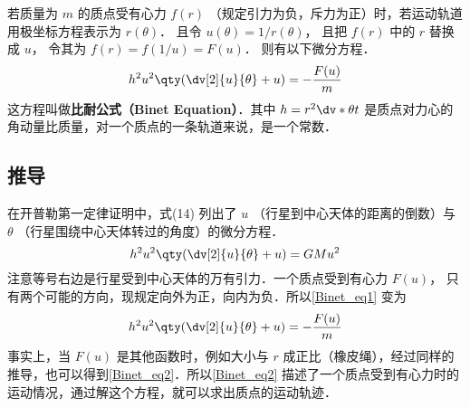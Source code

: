

若质量为 $m$ 的质点受有心力 $f(r)$ （规定引力为负，斥力为正）时，若运动轨道用极坐标方程表示为 $r(\theta)$． 且令 $u(\theta) = 1/r(\theta)$， 且把 $f(r)$ 中的 $r$ 替换成 $u$， 令其为
 $f(r) = f(1/u) = F(u)$． 则有以下微分方程．
 \begin{equation}
{h^2}{u^2}\qty( \dv[2]{u}{\theta} + u ) = -\frac{F(u)}{m}
\end{equation} 
这方程叫做\textbf{比耐公式（Binet Equation）}．其中 $h = {r^2} \dv*{\theta}{t}$ 是质点对力心的角动量比质量，对一个质点的一条轨道来说，是一个常数．

\subsection{推导}
在开普勒第一定律证明中，式(14)%
列出了 $u$ （行星到中心天体的距离的倒数）与 $\theta $ （行星围绕中心天体转过的角度）的微分方程． 
\begin{equation}\label{Binet_eq1}
{h^2}{u^2} \qty( \dv[2]{u}{\theta} + u ) =  GMu^2
\end{equation} 
注意等号右边是行星受到中心天体的万有引力．一个质点受到有心力%
 $F(u)$， 只有两个可能的方向，现规定向外为正，向内为负．所以\autoref{Binet_eq1} 变为
\begin{equation}\label{Binet_eq2}
h^2 u^2 \qty( \dv[2]{u}{\theta} + u ) = -\frac{F(u)}{m}
\end{equation} 
事实上，当 $F(u)$ 是其他函数时，例如大小与 $r$ 成正比（橡皮绳），经过同样的推导，也可以得到\autoref{Binet_eq2}．所以\autoref{Binet_eq2} 描述了一个质点受到有心力时的运动情况，通过解这个方程，就可以求出质点的运动轨迹．














